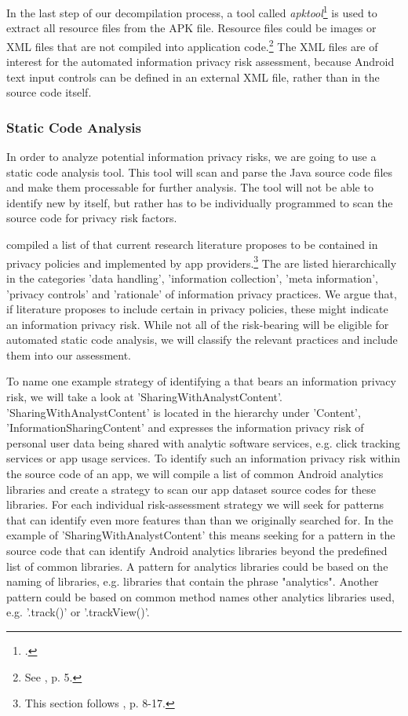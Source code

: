 \documentclass[
	a4paper,
	oneside,
	12pt,
	liststotocnumbered
]{article}
\let\cite\textcite
\begin{document}
In the last step of our decompilation process, a tool called \textit{apktool}\footnote{\cite{Tumbleson2010}.} is used to extract all resource files from the \acs{APK} file. Resource files could be images or XML files that are not compiled into application code.\footnote{See \cite{xu2013}, p. 5.}
The XML files are of interest for the automated information privacy risk assessment, because Android text input controls can be defined in an external XML file, rather than in the source code itself.

\subsubsection{Static Code Analysis}
In order to analyze potential information privacy risks, we are going to use a static code analysis tool.
This tool will scan and parse the Java source code files and make them processable for further analysis.
The \sca tool will not be able to identify new \prfs by itself, but rather has to be individually programmed to scan the source code for privacy risk factors.

\cite{Dehling2016} compiled a list of \ipp that current research literature proposes to be contained in privacy policies and implemented by app providers.\footnote{This section follows \cite{Dehling2016}, p. 8-17.}
The \ipp are listed hierarchically in the categories 'data handling', 'information collection', 'meta information', 'privacy controls' and 'rationale' of information privacy practices.
We argue that, if literature proposes to include certain \ipp in privacy policies, these \ipp might indicate an information privacy risk.
While not all of the risk-bearing \cite{Dehling2016} \ipp will be eligible for automated static code analysis, we will classify the relevant practices and include them into our \sca assessment.

To name one example strategy of identifying a \ipp that bears an information privacy risk, we will take a look at 'SharingWithAnalystContent'.
'SharingWithAnalystContent' is located in the \ipp hierarchy under 'Content', 'InformationSharingContent' and expresses the information privacy risk of personal user data being shared with analytic software services, e.g. click tracking services or app usage services.
To identify such an information privacy risk within the source code of an app, we will compile a list of common Android analytics libraries and create a \sca strategy to scan our app dataset source codes for these libraries.
For each individual risk-assessment strategy we will seek for patterns that can identify even more features than than we originally searched for.
In the example of 'SharingWithAnalystContent' this means seeking for a pattern in the source code that can identify Android analytics libraries beyond the predefined list of common libraries.
A pattern for analytics libraries could be based on the naming of libraries, e.g. libraries that contain the phrase "analytics". 
Another pattern could be based on common method names other analytics libraries used, e.g. '.track()' or '.trackView()'.
\end{document}
